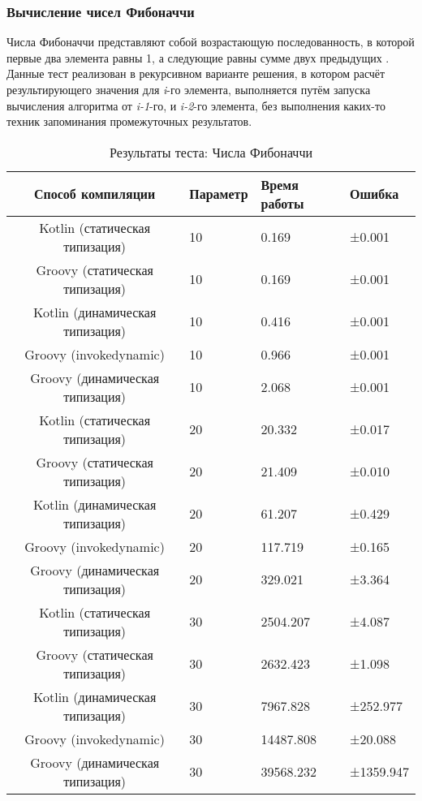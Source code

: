 \subsubsection{Вычисление чисел Фибоначчи}

Числа Фибоначчи представляют собой возрастающую последованность, в которой первые два элемента равны 1, а следующие равны сумме двух предыдущих \cite{math:vilenkin1969Combinatorics}. Данные тест реализован в рекурсивном варианте решения, в котором расчёт результирующего значения для \textit{i}-го элемента, выполняется путём запуска вычисления алгоритма от \textit{i-1}-го, и \textit{i-2}-го элемента, без выполнения каких-то техник запоминания промежуточных результатов.

\begin{table}[h]
\caption{\label{tab:fibBenchResults}Результаты теста: Числа Фибоначчи}
\begin{center}
\begin{tabular}{|c|l|l|l|}
\hline
Способ компиляции & Параметр & Время работы & Ошибка \\
\hline
Kotlin (статическая типизация) & 10 & 0.169 & ±0.001 \\
Groovy (статическая типизация) & 10 & 0.169 & ±0.001 \\
Kotlin (динамическая типизация) & 10 & 0.416 & ±0.001 \\
Groovy (invokedynamic) & 10 & 0.966 & ±0.001 \\
Groovy (динамическая типизация) & 10 & 2.068 & ±0.001 \\
Kotlin (статическая типизация) & 20 & 20.332 & ±0.017 \\
Groovy (статическая типизация) & 20 & 21.409 & ±0.010 \\
Kotlin (динамическая типизация) & 20 & 61.207 & ±0.429 \\
Groovy (invokedynamic) & 20 & 117.719 & ±0.165 \\
Groovy (динамическая типизация) & 20 & 329.021 & ±3.364 \\
Kotlin (статическая типизация) & 30 & 2504.207 & ±4.087 \\
Groovy (статическая типизация) & 30 & 2632.423 & ±1.098 \\
Kotlin (динамическая типизация) & 30 & 7967.828 & ±252.977 \\
Groovy (invokedynamic) & 30 & 14487.808 & ±20.088 \\
Groovy (динамическая типизация) & 30 & 39568.232 & ±1359.947 \\
\hline
\end{tabular}
\end{center}
\end{table} 


